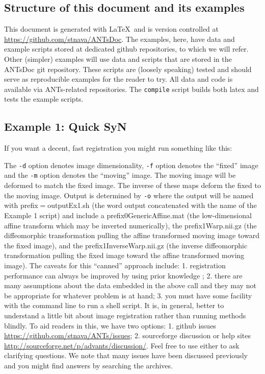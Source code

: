 \documentclass{InsightArticle}
\begin{document}
\subsection{Structure of this document and its examples}
This document is generated with \LaTeX ~and is version controlled at
\href{https://github.com/stnava/ANTsDoc}{https://github.com/stnava/ANTsDoc}.
The examples, here, have data and example scripts stored at dedicated
github repositories, to which we will refer.  Other (simpler) examples will use
data and scripts that are stored in the ANTsDoc git repository.  These
scripts are (loosely speaking) tested and should serve as reproducible
examples for the reader to try.  All data and code is available via
ANTs-related repositories.  The \texttt{compile} script builds both
latex and tests the example scripts.

\subsection{Example 1: Quick SyN}
If you want a decent, fast registration you might run something like this:

The \texttt{-d} option denotes image dimensionality, \texttt{-f} option denotes the ``fixed'' image and the \texttt{-m} option
denotes the ``moving'' image.  The moving image will be deformed to
match the fixed image.  The inverse of these maps deform the fixed to
the moving image.  Output is determined by \texttt{-o} where the output
will be named with prefix$=$outputEx1.sh (the word output concatenated
with the name of the Example 1 script) and include a
prefix0GenericAffine.mat (the low-dimensional affine transform which
may be inverted numerically), the prefix1Warp.nii.gz (the
diffeomorphic transformation pulling the affine transformed moving
image toward the fixed image), and the prefix1InverseWarp.nii.gz (the inverse
diffeomorphic transformation pulling the fixed image toward the affine transformed moving
image).
The caveats for this ``canned'' approach include:  1. registration
performance can always be improved by using prior knowledge
\cite{Wolpert1997}; 2. there are many assumptions about the data
embedded in the above call and they may not be appropriate for
whatever problem is at hand; 3. you must have some facility with the command line
to run a shell script.  It is, in general, better to understand a
little bit about image registration rather than running methods
blindly.   To aid readers in this, we have two options: 1. github
issues
\href{https://github.com/stnava/ANTs/issues}{https://github.com/stnava/ANTs/issues};
2.  sourceforge discussion or help sites
\href{http://sourceforge.net/p/advants/discussion/}{http://sourceforge.net/p/advants/discussion/}.
Feel free to use either to ask clarifying questions.  We note that many
issues have been discussed previously and you might find answers by
searching the archives.
\end{document}
